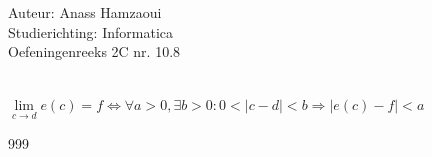 \documentclass[a4paper]{article}
\begin{document}
  
\noindent \large Auteur: Anass Hamzaoui \\
\noindent \large Studierichting: Informatica\\
\noindent \large Oefeningenreeks 2C nr. 10.8\\
\medskip
\normalsize\

$\lim\limits_{c \rightarrow d} e(c) = f 
\Leftrightarrow 
\forall a > 0, \exists b > 0 : 0 < | c - d| < b 
\Rightarrow |e(c) - f| < a$

\begin{thebibliography}{999}
\end{thebibliography}
\end{document}
